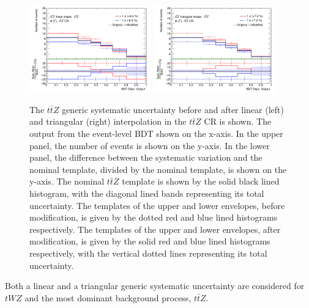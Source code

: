 \begin{figure}[h!]
  \includegraphics[width=0.47\textwidth]{figures/lep4_ttZ_4T_ttz_ttZShapeLin.png}
  \includegraphics[width=0.47\textwidth]{figures/lep4_ttZ_4T_ttz_ttZShapeTri.png}
  \centering
  
  \caption{The $t\bar{t}Z$ generic systematic uncertainty before and after linear (left) and triangular (right) interpolation in the $t\bar{t}Z$ CR is shown. The output from the event-level BDT shown on the x-axis. In the upper panel, the number of events is shown on the y-axis. In the lower panel, the difference between the systematic variation and the nominal template, divided by the nominal template, is shown on the y-axis. The nominal $t\bar{t}Z$ template is shown by the solid black lined histogram, with the diagonal lined bands representing its total uncertainty. The templates of the upper and lower envelopes, before modification, is given by the dotted red and blue lined histograms respectively. The templates of the upper and lower envelopes, after modification, is given by the solid red and blue lined histograms respectively, with the vertical dotted lines representing its total uncertainty. }
  \label{fig:genericShapeSystexamples}
\end{figure}Both a linear and a triangular generic systematic uncertainty are considered for $tWZ$ and the most dominant background process, $t\bar{t}Z$.

